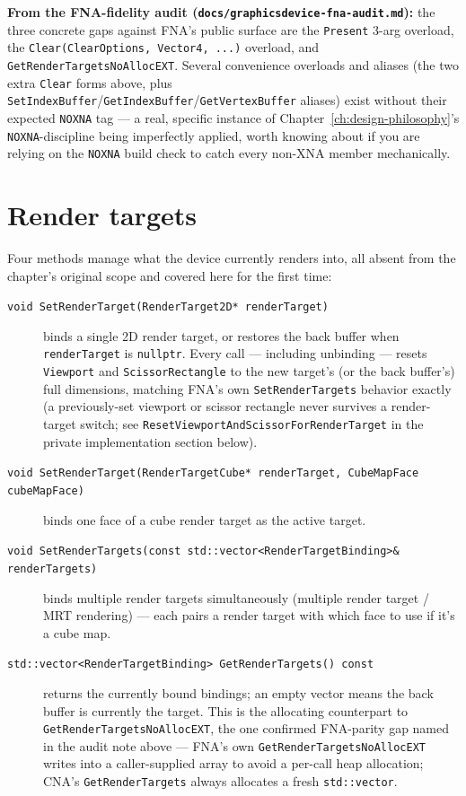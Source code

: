 \begin{sourcenote}
\textbf{From the FNA-fidelity audit (\texttt{docs/graphicsdevice-fna-audit.md}):} the three
concrete gaps against FNA's public surface are the \texttt{Present} 3-arg overload, the
\texttt{Clear(ClearOptions, Vector4, ...)} overload, and \texttt{GetRenderTargetsNoAllocEXT}.
Several convenience overloads and aliases (the two extra \texttt{Clear} forms above, plus
\texttt{SetIndexBuffer}/\texttt{GetIndexBuffer}/\texttt{GetVertexBuffer} aliases) exist without
their expected \texttt{NOXNA} tag --- a real, specific instance of
Chapter~\ref{ch:design-philosophy}'s \texttt{NOXNA}-discipline being imperfectly applied, worth
knowing about if you are relying on the \texttt{NOXNA} build check to catch every non-XNA
member mechanically.
\end{sourcenote}

\section{Render targets}
\label{sec:render-targets}

Four methods manage what the device currently renders into, all absent from the chapter's
original scope and covered here for the first time:

\begin{description}
\item[\texttt{void SetRenderTarget(RenderTarget2D* renderTarget)}] binds a single 2D render
  target, or restores the back buffer when \texttt{renderTarget} is \texttt{nullptr}. Every call
  --- including unbinding --- resets \texttt{Viewport} and \texttt{ScissorRectangle} to the new
  target's (or the back buffer's) full dimensions, matching FNA's own
  \texttt{SetRenderTargets} behavior exactly (a previously-set viewport or scissor rectangle
  never survives a render-target switch; see \texttt{ResetViewportAndScissorForRenderTarget} in
  the private implementation section below).
\item[\texttt{void SetRenderTarget(RenderTargetCube* renderTarget, CubeMapFace cubeMapFace)}]
  binds one face of a cube render target as the active target.
\item[\texttt{void SetRenderTargets(const std::vector<RenderTargetBinding>\& renderTargets)}]
  binds multiple render targets simultaneously (multiple render target / MRT rendering) ---
  each  pairs a render target with which face to use if it's a
  cube map.
\item[\texttt{std::vector<RenderTargetBinding> GetRenderTargets() const}] returns the currently
  bound bindings; an empty vector means the back buffer is currently the target. This is the
  allocating counterpart to \texttt{GetRenderTargetsNoAllocEXT}, the one confirmed FNA-parity
  gap named in the audit note above --- FNA's own \texttt{GetRenderTargetsNoAllocEXT} writes
  into a caller-supplied array to avoid a per-call heap allocation; CNA's \texttt{GetRenderTargets}
  always allocates a fresh \texttt{std::vector}.
\end{description}

